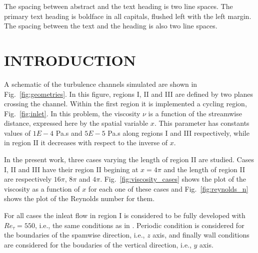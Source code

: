 \documentclass[twocolumn,10pt]{asme2e}
\begin{document}
\begin{nomenclature}
\end{nomenclature}

The spacing between abstract and the text heading is two line spaces.  The primary text heading is  boldface in all capitals, flushed left with the left margin.  The spacing between the  text and the heading is also two line spaces.

\section*{INTRODUCTION}

A schematic of the turbulence channels simulated are shown in Fig.~\ref{fig:geometries}. In this figure, regions I, II and III are defined by two planes crossing the channel. Within the first region it is implemented a cycling region, Fig.~\ref{fig:inlet}.
In this problem, the viscosity \(\nu\) is a function of the streamwise distance, expressed here by the spatial variable \(x\). This parameter has constants values of \(1E-4\) Pa.s and \(5E-5\) Pa.s along regions I and III respectively, while in region II it decreases with respect to the inverse of \(x\).

In the present work, three cases varying the length of region II are studied. Cases I, II and III have their region II begining at \(x=4\pi\) and the length of region II are respectively \(16\pi\), \(8\pi\) and \(4\pi\). Fig.~\ref{fig:viscosity_cases} shows the plot of the viscosity as a function of \(x\) for each one of these cases and Fig.~\ref{fig:reynolds_n} shows the plot of the Reynolds number for them.

For all cases the inleat flow in region I is considered to be fully developed with \(Re_{\tau}=550\), i.e., the same conditions as in \cite{hoyas2008}. Periodic condition is considered for the boundaries of the spamwise direction, i.e., \(z\) axis, and finally wall conditions are considered for the boudaries of the vertical direction, i.e., \(y\) axis.
\end{document}
